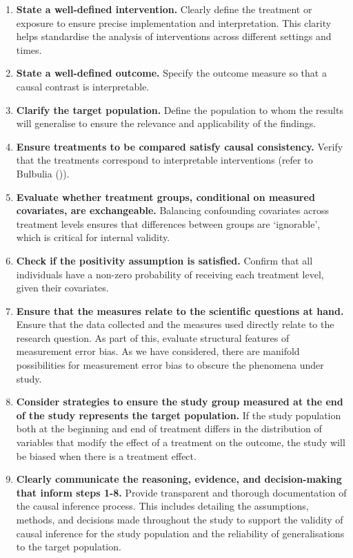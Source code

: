 \documentclass[
  single column]{article}
\begin{document}
\begin{enumerate}
\def\labelenumi{\arabic{enumi}.}
\item
  \textbf{State a well-defined intervention.} Clearly define the
  treatment or exposure to ensure precise implementation and
  interpretation. This clarity helps standardise the analysis of
  interventions across different settings and times.
\item
  \textbf{State a well-defined outcome.} Specify the outcome measure so
  that a causal contrast is interpretable.
\item
  \textbf{Clarify the target population.} Define the population to whom
  the results will generalise to ensure the relevance and applicability
  of the findings.
\item
  \textbf{Ensure treatments to be compared satisfy causal consistency.}
  Verify that the treatments correspond to interpretable interventions
  (refer to Bulbulia ()).
\item
  \textbf{Evaluate whether treatment groups, conditional on measured
  covariates, are exchangeable.} Balancing confounding covariates across
  treatment levels ensures that differences between groups are
  `ignorable', which is critical for internal validity.
\item
  \textbf{Check if the positivity assumption is satisfied.} Confirm that
  all individuals have a non-zero probability of receiving each
  treatment level, given their covariates.
\item
  \textbf{Ensure that the measures relate to the scientific questions at
  hand.} Ensure that the data collected and the measures used directly
  relate to the research question. As part of this, evaluate structural
  features of measurement error bias. As we have considered, there are
  manifold possibilities for measurement error bias to obscure the
  phenomena under study.
\item
  \textbf{Consider strategies to ensure the study group measured at the
  end of the study represents the target population.} If the study
  population both at the beginning and end of treatment differs in the
  distribution of variables that modify the effect of a treatment on the
  outcome, the study will be biased when there is a treatment effect.
\item
  \textbf{Clearly communicate the reasoning, evidence, and
  decision-making that inform steps 1-8.} Provide transparent and
  thorough documentation of the causal inference process. This includes
  detailing the assumptions, methods, and decisions made throughout the
  study to support the validity of causal inference for the study
  population and the reliability of generalisations to the target
  population.
\end{enumerate}
\end{document}
